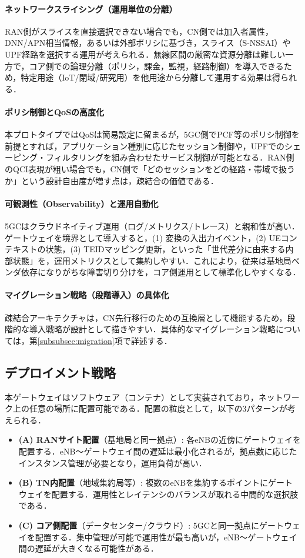 \paragraph{ネットワークスライシング（運用単位の分離）}
RAN側がスライスを直接選択できない場合でも，CN側では加入者属性，DNN/APN相当情報，あるいは外部ポリシに基づき，スライス（S-NSSAI）やUPF経路を選択する運用が考えられる．無線区間の厳密な資源分離は難しい一方で，コア側での論理分離（ポリシ，課金，監視，経路制御）を導入できるため，特定用途（IoT/閉域/研究用）を他用途から分離して運用する効果は得られる．

\paragraph{ポリシ制御とQoSの高度化}
本プロトタイプではQoSは簡易設定に留まるが，5GC側でPCF等のポリシ制御を前提とすれば，アプリケーション種別に応じたセッション制御や，UPFでのシェーピング・フィルタリングを組み合わせたサービス制御が可能となる．RAN側のQCI表現が粗い場合でも，CN側で「どのセッションをどの経路・帯域で扱うか」という設計自由度が増す点は，疎結合の価値である．

\paragraph{可観測性（Observability）と運用自動化}
5GCはクラウドネイティブ運用（ログ/メトリクス/トレース）と親和性が高い．ゲートウェイを境界として導入すると，(1) 変換の入出力イベント，(2) UEコンテキストの状態，(3) TEIDマッピング更新，といった「世代差分に由来する内部状態」を，運用メトリクスとして集約しやすい．これにより，従来は基地局ベンダ依存になりがちな障害切り分けを，コア側運用として標準化しやすくなる．

\paragraph{マイグレーション戦略（段階導入）の具体化}
疎結合アーキテクチャは，CN先行移行のための互換層として機能するため，段階的な導入戦略が設計として描きやすい．具体的なマイグレーション戦略については，第\ref{subsubsec:migration}項で詳述する．

\subsection{デプロイメント戦略}
本ゲートウェイはソフトウェア（コンテナ）として実装されており，ネットワーク上の任意の場所に配置可能である．配置の粒度として，以下の3パターンが考えられる．
\begin{itemize}
    \item \textbf{(A) RANサイト配置}（基地局と同一拠点）: 各eNBの近傍にゲートウェイを配置する．eNB〜ゲートウェイ間の遅延は最小化されるが，拠点数に応じたインスタンス管理が必要となり，運用負荷が高い．
    \item \textbf{(B) TN内配置}（地域集約局等）: 複数のeNBを集約するポイントにゲートウェイを配置する．運用性とレイテンシのバランスが取れる中間的な選択肢である．
    \item \textbf{(C) コア側配置}（データセンター/クラウド）: 5GCと同一拠点にゲートウェイを配置する．集中管理が可能で運用性が最も高いが，eNB〜ゲートウェイ間の遅延が大きくなる可能性がある．
\end{itemize}


